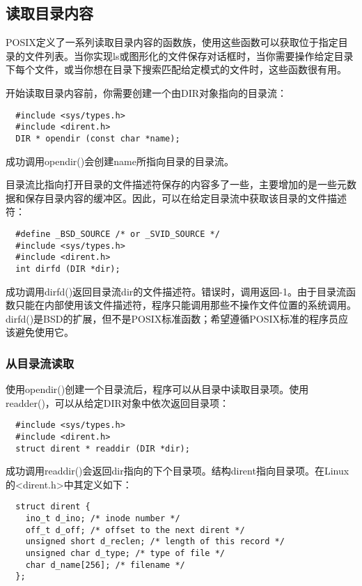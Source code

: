 \subsection{读取目录内容}

POSIX定义了一系列读取目录内容的函数族，使用这些函数可以获取位于指定目录的文件列表。当你实现ls或图形化的文件保存对话框时，当你需要操作给定目录下每个文件，或当你想在目录下搜索匹配给定模式的文件时，这些函数很有用。

开始读取目录内容前，你需要创建一个由DIR对象指向的目录流：

\begin{lstlisting}
  #include <sys/types.h>
  #include <dirent.h>
  DIR * opendir (const char *name);
\end{lstlisting}

成功调用opendir()会创建name所指向目录的目录流。

目录流比指向打开目录的文件描述符保存的内容多了一些，主要增加的是一些元数据和保存目录内容的缓冲区。因此，可以在给定目录流中获取该目录的文件描述符：

\begin{lstlisting}
  #define _BSD_SOURCE /* or _SVID_SOURCE */
  #include <sys/types.h>
  #include <dirent.h>
  int dirfd (DIR *dir);
\end{lstlisting}

成功调用dirfd()返回目录流dir的文件描述符。错误时，调用返回-1。由于目录流函数只能在内部使用该文件描述符，程序只能调用那些不操作文件位置的系统调用。dirfd()是BSD的扩展，但不是POSIX标准函数；希望遵循POSIX标准的程序员应该避免使用它。 

\subsubsection{从目录流读取}

使用opendir()创建一个目录流后，程序可以从目录中读取目录项。使用readder()，可以从给定DIR对象中依次返回目录项：

\begin{lstlisting}
  #include <sys/types.h>
  #include <dirent.h>
  struct dirent * readdir (DIR *dir);
\end{lstlisting}

成功调用readdir()会返回dir指向的下个目录项。结构dirent指向目录项。在Linux的<dirent.h>中其定义如下：

\begin{lstlisting}
  struct dirent {
    ino_t d_ino; /* inode number */
    off_t d_off; /* offset to the next dirent */
    unsigned short d_reclen; /* length of this record */
    unsigned char d_type; /* type of file */
    char d_name[256]; /* filename */
  };
\end{lstlisting}

